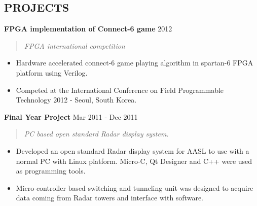 \documentclass[mm]{res} %
\begin{document}
\begin{resume}
\vspace{2 mm}
\section{PROJECTS} 

\textbf{FPGA implementation of Connect-6 game} \hfill 2012
\begin{quote}
\emph{FPGA international competition}
\end{quote}

\begin{itemize} \itemsep -1pt %
\item Hardware accelerated connect-6 game playing algorithm in spartan-6 FPGA platform using Verilog. 
\item Competed at the International Conference on Field Programmable Technology 2012 - Seoul, South Korea.
\end{itemize}


\textbf{Final Year Project} \hfill Mar 2011 - Dec 2011
\begin{quote}
\emph{PC based open standard Radar display system.}
\end{quote}

\begin{itemize} \itemsep -1pt %
\item Developed an open standard Radar display system for AASL to use with a normal PC
with Linux platform. Micro-C, Qt Designer and C++ were used as programming tools.
\item Micro-controller based switching and tunneling unit was designed to acquire data coming from Radar towers and interface with software.
\end{itemize}




\end{resume}
\end{document}

